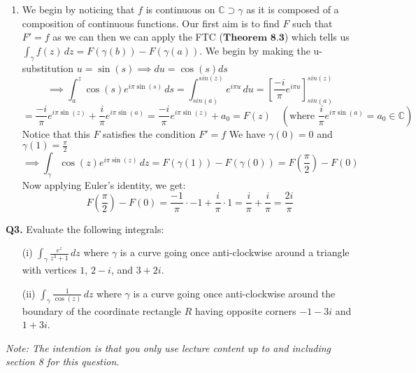 \documentclass[12pt]{article}
\begin{document}
\begin{enumerate}[label=\textbf{(\roman*)}]
\item We begin by noticing that \(f\) is continuous on \(\mathbb{C} \supset \gamma\) as it is composed of a composition of continuous functions. Our first aim is to find \(F\) such that \(F' = f\) as we can then we can apply the FTC (\(\textbf{Theorem 8.3}\)) which tells us \(\int_{\gamma} f(z) \, dz = F(\gamma(b)) - F(\gamma(a))\).\newline
    \linebreak
    We begin by making the u-substitution \(u = \sin(s) \implies du = \cos(s)ds\)
    \[ \implies \int_{a}^{z} \cos(s) e^{i\pi \sin(s)} \, ds = \int_{sin(a)}^{sin(z)} e^{i\pi u} \,du = \left[\frac{-i}{\pi}e^{i\pi u}\right]_{sin(a)}^{sin(z)}  \]
    \[= \frac{-i}{\pi}e^{i\pi \sin(z)} +  \frac{i}{\pi}e^{i\pi \sin(a)} = \frac{-i}{\pi}e^{i\pi \sin(z)} + a_0 = F(z) \quad \left(\text{where }\frac{i}{\pi}e^{i\pi \sin(a)} = a_0 \in \mathbb{C}\right)\]
    Notice that this \(F\) satisfies the condition \(F' = f\)\newline
    \linebreak
    We have \(\gamma(0) = 0 \) and \(\gamma(1) = \frac{\pi}{2}\)
    \[\implies \int_{\gamma} \cos(z) e^{i\pi \sin(z)} \, dz = F(\gamma(1)) - F(\gamma(0)) = F(\frac{\pi}{2}) - F(0)\]
    Now applying Euler's identity, we get:
    \[  F(\frac{\pi}{2}) - F(0) = \frac{-1}{\pi}\cdot-1 + \frac{i}{\pi}\cdot1 = \frac{i}{\pi} + \frac{i}{\pi} = \frac{2i}{\pi}\] 

\end{enumerate}
\[\]
\textbf{Q3.} Evaluate the following integrals:
\begin{itemize}
    \item[(i)] \(\int_{\gamma} \frac{e^z}{z^3 + 1} \, dz\) where \(\gamma\) is a curve going once anti-clockwise around a triangle with vertices \(1\), \(2 - i\), and \(3 + 2i\).
    \item[(ii)] \(\int_{\gamma} \frac{1}{\cos(z)} \, dz\) where \(\gamma\) is a curve going once anti-clockwise around the boundary of the coordinate rectangle \(R\) having opposite corners \(-1 - 3i\) and \(1 + 3i\).
\end{itemize}

\noindent \textit{Note: The intention is that you only use lecture content up to and including section 8 for this question.}
\end{document}
